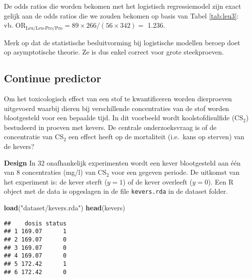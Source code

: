 \documentclass[12pt,dutch,coursenotes]{book}
\newenvironment{Shaded}{\begin{snugshade}}{\end{snugshade}}
\newcommand{\KeywordTok}[1]{\textcolor[rgb]{0.13,0.29,0.53}{\textbf{#1}}}
\newcommand{\StringTok}[1]{\textcolor[rgb]{0.31,0.60,0.02}{#1}}
\newcommand{\OperatorTok}[1]{\textcolor[rgb]{0.81,0.36,0.00}{\textbf{#1}}}
\newcommand{\NormalTok}[1]{#1}
\theoremstyle{definition}
\theoremstyle{definition}
\theoremstyle{definition}
\theoremstyle{remark}
\begin{document}
De odds ratios die worden bekomen met het logistisch regressiemodel zijn
exact gelijk aan de odds ratios die we zouden bekomen op basis van Tabel
\ref{tab:leu3}: vb.
\(\text{OR}_\text{Leu/Leu-Pro/Pro}=89\times 266/(56\times 342)=\) 1.236.

Merk op dat de statistische besluitvorming bij logistische modellen
beroep doet op asymptotische theorie. Ze is dus enkel correct voor grote
steekproeven.

\subsection{Continue predictor}\label{continue-predictor}

Om het toxicologisch effect van een stof te kwantificeren worden
dierproeven uitgevoerd waarbij dieren bij verschillende concentraties
van de stof worden blootgesteld voor een bepaalde tijd. In dit voorbeeld
wordt koolstofdisulfide (CS\(_2\)) bestudeerd in proeven met kevers. De
centrale onderzoeksvraag is of de concentratie van CS\(_2\) een effect
heeft op de mortaliteit (i.e.~kans op sterven) van de kevers?

\textbf{Design} In 32 onafhankelijk experimenten wordt een kever
blootgesteld aan één van 8 concentraties (mg/l) van CS\(_2\) voor een
gegeven periode. De uitkomst van het experiment is: de kever sterft
(\(y=1\)) of de kever overleeft (\(y=0\)). Een R object met de data is
opgeslagen in de file \texttt{kevers.rda} in de dataset folder.

\begin{Shaded}
\begin{Highlighting}[]
\KeywordTok{load}\NormalTok{(}\StringTok{"dataset/kevers.rda"}\NormalTok{)}
\KeywordTok{head}\NormalTok{(kevers)}
\end{Highlighting}
\end{Shaded}

\begin{verbatim}
##    dosis status
## 1 169.07      1
## 2 169.07      0
## 3 169.07      0
## 4 169.07      0
## 5 172.42      1
## 6 172.42      0
\end{verbatim}

\begin{Shaded}
\end{Shaded}
\end{document}
